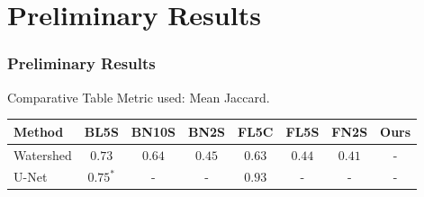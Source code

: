 \section{Preliminary Results}


\begin{frame}{}
    \frametitle{Preliminary Results}
\end{frame}


\begin{frame}{Comparative Table}
    Metric used: \alert{Mean Jaccard}.
    \begin{table}[]
        \centering
        \setlength{\tabcolsep}{10pt}
        
        {
            \begin{tabular}{lccccccc}
                Method & BL5S & BN10S & BN2S & FL5C & FL5S & FN2S & Ours \\
                \midrule
                Watershed & $0.73$ & $0.64$ & $0.45$ &  $0.63$ & $0.44$ & $0.41$ & - \\
                U-Net & $0.75^*$ & - & - & $0.93$ & - & - & -
            \end{tabular}
        }
    \end{table}
\end{frame}


